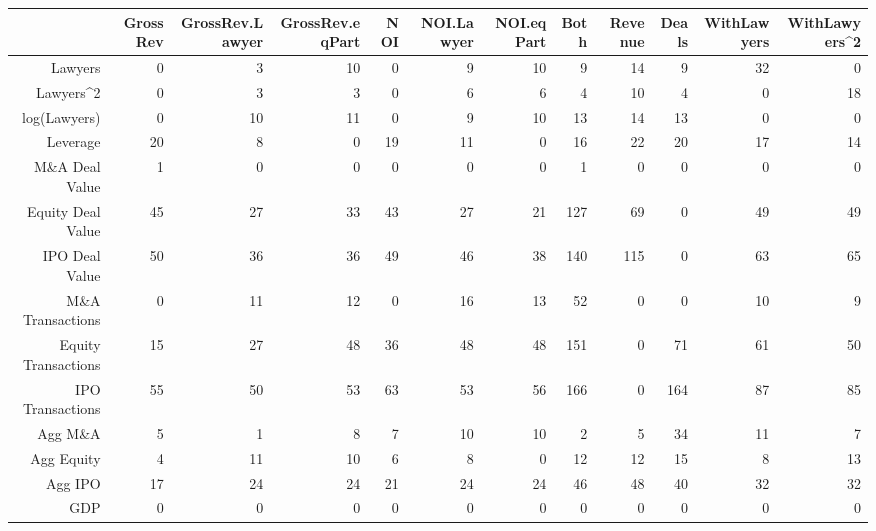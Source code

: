 \documentclass{article}
\begin{document}
\begin{table}[H]
\centering
\begin{tabular}{rrrrrrrrrrrr}
  \hline
 & GrossRev & GrossRev.Lawyer & GrossRev.eqPart & NOI & NOI.Lawyer & NOI.eqPart & Both & Revenue & Deals & WithLawyers & WithLawyers^2 \\
  \hline
Lawyers & 0 & 3 & 10 & 0 & 9 & 10 & 9 & 14 & 9 & 32 & 0 \\
  Lawyers^2 & 0 & 3 & 3 & 0 & 6 & 6 & 4 & 10 & 4 & 0 & 18 \\
  log(Lawyers) & 0 & 10 & 11 & 0 & 9 & 10 & 13 & 14 & 13 & 0 & 0 \\
  Leverage & 20 & 8 & 0 & 19 & 11 & 0 & 16 & 22 & 20 & 17 & 14 \\
  M\&A Deal Value & 1 & 0 & 0 & 0 & 0 & 0 & 1 & 0 & 0 & 0 & 0 \\
  Equity Deal Value & 45 & 27 & 33 & 43 & 27 & 21 & 127 & 69 & 0 & 49 & 49 \\
  IPO Deal Value & 50 & 36 & 36 & 49 & 46 & 38 & 140 & 115 & 0 & 63 & 65 \\
  M\&A Transactions & 0 & 11 & 12 & 0 & 16 & 13 & 52 & 0 & 0 & 10 & 9 \\
  Equity Transactions & 15 & 27 & 48 & 36 & 48 & 48 & 151 & 0 & 71 & 61 & 50 \\
  IPO Transactions & 55 & 50 & 53 & 63 & 53 & 56 & 166 & 0 & 164 & 87 & 85 \\
  Agg M\&A & 5 & 1 & 8 & 7 & 10 & 10 & 2 & 5 & 34 & 11 & 7 \\
  Agg Equity & 4 & 11 & 10 & 6 & 8 & 0 & 12 & 12 & 15 & 8 & 13 \\
  Agg IPO & 17 & 24 & 24 & 21 & 24 & 24 & 46 & 48 & 40 & 32 & 32 \\
  GDP & 0 & 0 & 0 & 0 & 0 & 0 & 0 & 0 & 0 & 0 & 0 \\
   \hline
\end{tabular}
\end{table}
\end{document}
